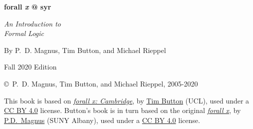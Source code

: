 \thispagestyle{empty}


    
\vspace{20pt}
    
\begin{center}
\fontsize{36pt}{36pt}\selectfont
  \textbf{forall \textit{x} @ syr}

\fontsize{24pt}{24pt}\selectfont
\vspace{1em}
\textit{An Introduction to\\ Formal Logic}


\vspace{40pt}

\fontsize{16pt}{18pt}\selectfont By P.~D. Magnus, Tim Button, and Michael Rieppel\\

\vspace{85pt}

\fontsize{20pt}{20pt}\selectfont
Fall 2020 Edition
\end{center}

\newpage


\noindent \small \copyright \ P.~D. Magnus, Tim Button, and Michael Rieppel, 2005-2020

\vspace{1ex}

\noindent This book is based on \href{http://www.homepages.ucl.ac.uk/~uctytbu/forallxcam.pdf}{\emph{forall x: Cambridge}}, by  \href{http://www.homepages.ucl.ac.uk/~uctytbu}{Tim Button}
(UCL), used under a \href{https://creativecommons.org/licenses/by/4.0/}{CC BY 4.0} license.  Button's book is in turn based on the original \href{https://www.fecundity.com/logic/}{\emph{forall x}}, by
\href{https://www.fecundity.com/job/}{P.D.\ Magnus} (SUNY Albany), used under a \href{https://creativecommons.org/licenses/by/4.0/}{CC BY 4.0} license.

